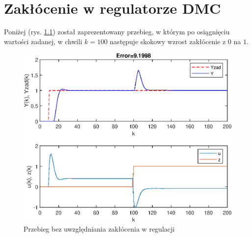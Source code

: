 \chapter{Zakłócenie w regulatorze DMC}
\label{zad5}
Poniżej (rys. \ref{fig:zak_bezr}) został zaprezentowany przebieg, w którym po osiągnięciu wartości zadanej, w chwili $k=100$ następuje skokowy wzrost zakłócenie z $0$ na $1$.

\begin{figure}[h!]
	\centering
	\includegraphics[scale=1]{Rys/zak_bezr.eps}
	\caption{Przebieg bez uwzględniania zakłócenia w regulacji}
	\label{fig:zak_bezr}
\end{figure}